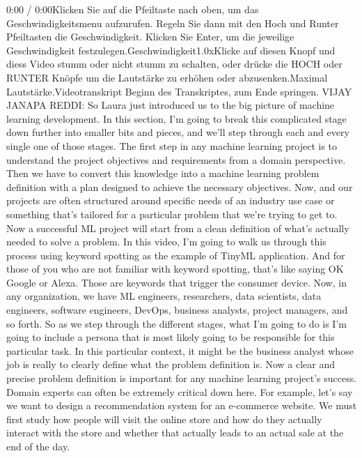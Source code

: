     0:00 / 0:00Klicken Sie auf die Pfeiltaste nach oben, um das Geschwindigkeitsmenu aufzurufen. Regeln Sie dann mit den Hoch und Runter Pfeiltasten die Geschwindigkeit. Klicken Sie Enter, um die jeweilige Geschwindigkeit festzulegen.Geschwindigkeit1.0xKlicke auf diesen Knopf und diess Video stumm oder nicht stumm zu schalten, oder drücke die HOCH oder RUNTER Knöpfe um die Lautstärke zu erhöhen oder abzusenken.Maximal Lautstärke.Videotranskript
    Beginn des Transkriptes, zum Ende springen.
    VIJAY JANAPA REDDI: So Laura just introduced us
    to the big picture of machine learning development.
    In this section, I'm going to break this complicated stage down further
    into smaller bits and pieces, and we'll step through each
    and every single one of those stages.
    The first step in any machine learning project
    is to understand the project objectives and requirements from a domain
    perspective.
    Then we have to convert this knowledge into a machine learning
    problem definition with a plan designed to achieve the necessary objectives.
    Now, and our projects are often structured
    around specific needs of an industry use case or something
    that's tailored for a particular problem that we're trying to get to.
    Now a successful ML project will start from a clean definition of what's
    actually needed to solve a problem.
    In this video, I'm going to walk us through this process using
    keyword spotting as the example of TinyML application.
    And for those of you who are not familiar with keyword spotting,
    that's like saying OK Google or Alexa.
    Those are keywords that trigger the consumer device.
    Now, in any organization, we have ML engineers,
    researchers, data scientists, data engineers, software engineers, DevOps,
    business analysts, project managers, and so forth.
    So as we step through the different stages, what I'm going to do
    is I'm going to include a persona that is most likely going to be
    responsible for this particular task.
    In this particular context, it might be the business analyst
    whose job is really to clearly define what the problem definition is.
    Now a clear and precise problem definition is important for any machine
    learning project's success.
    Domain experts can often be extremely critical down here.
    For example, let's say we want to design a recommendation
    system for an e-commerce website.
    We must first study how people will visit the online store
    and how do they actually interact with the store
    and whether that actually leads to an actual sale at the end of the day.
